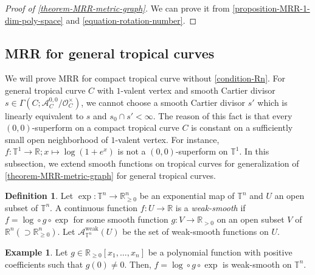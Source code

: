 \documentclass[a4paper,dvipdfmx,reqno,12pt]{amsart}
\theoremstyle{definition}
\newtheorem{definition}[theorem]{Definition}
\newtheorem{example}[theorem]{Example}
\newcommand{\opn}[1]{\operatorname{#1}}
\numberwithin{equation}{section}
\begin{document}
\begin{proof}[{Proof of \cref{theorem-MRR-metric-graph}}]
We can prove it from \cref{proposition-MRR-1-dim-poly-space}
and \cref{equation-rotation-number}.
\end{proof}


\subsection{MRR for general tropical curves}
\label{section-tropical-curve-general}
We will prove MRR for compact tropical curve 
without \cref{condition-Rn}. 
For general tropical curve $C$ with $1$-valent
vertex and smooth Cartier divisor 
$s\in\Gamma(C;\mathcal{A}^{0,0}_C/\mathcal{O}^{\times}_C)$,
we cannot choose a smooth Cartier divisor $s'$ which
is linearly equivalent to $s$ and $s_0\cap s'<\infty$.
The reason of this fact is that every 
$(0,0)$-superform on a compact tropical curve 
$C$ is constant on a sufficiently
small open neighborhood of $1$-valent vertex.
For instance, 
$f\colon \mathbb{T}^1 \to \mathbb{R}; x\mapsto 
\opn{log}(1+e^{x})$ is not a $(0,0)$-superform
on $\mathbb{T}^{1}$.
In this subsection, we extend smooth functions
on tropical curves for generalization of 
\cref{theorem-MRR-metric-graph} for general 
tropical curves.

\begin{definition} \label{definition-weak-smooth}
Let $\opn{exp}\colon \mathbb{T}^{n}\to 
\mathbb{R}_{\geq 0}^{n}$ be an exponential map of 
$\mathbb{T}^{n}$ and $U$ an open subset of 
$\mathbb{T}^{n}$.
A continuous function $f\colon U\to \mathbb{R}$
is a \emph{weak-smooth} if 
$f=\opn{log}\circ g\circ \opn{exp}$ for some 
smooth function $g\colon V\to \mathbb{R}_{>0}$ on 
an open subset $V$ of $\mathbb{R}^{n} 
(\supset \mathbb{R}_{\geq 0}^{n})$.
Let $\mathcal{A}_{\mathbb{T}^{n}}^{\mathrm{weak}}(U)$ 
be the set of weak-smooth functions on $U$.
\end{definition}

\begin{example}
Let 
$g\in \mathbb{R}_{\geq 0}[x_1,\ldots,x_n]$ be a polynomial 
function with positive coefficients such that $g(0)\ne 0$. 
Then, $f=\opn{log}\circ g \circ \opn{exp}$ is weak-smooth 
on $\mathbb{T}^{n}$.
\end{example}
\end{document}
